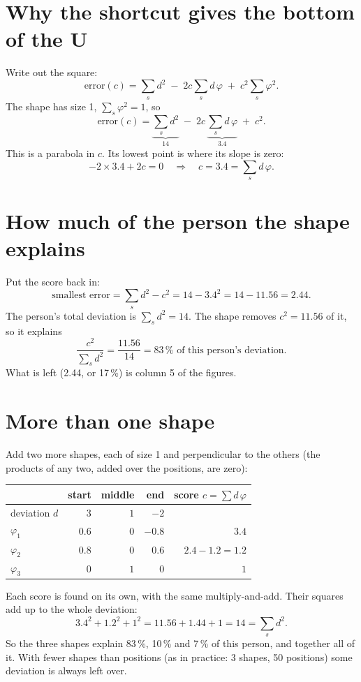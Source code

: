 \documentclass[11pt,a4paper]{article}
\begin{document}
\section{Why the shortcut gives the bottom of the U}
\label{sec:why}
Write out the square:
\[
  \text{error}(c) = \sum_s d^2 \;-\; 2c \sum_s d\,\varphi \;+\; c^2 \sum_s \varphi^2 .
\]
The shape has size 1, $\sum_s \varphi^2 = 1$, so
\[
  \text{error}(c) = \underbrace{\textstyle\sum_s d^2}_{14} \;-\; 2c\,\underbrace{\textstyle\sum_s d\,\varphi}_{3.4} \;+\; c^2 .
\]
This is a parabola in $c$. Its lowest point is where its slope is zero:
\[
  -2 \times 3.4 + 2c = 0 \quad\Longrightarrow\quad c = 3.4 = \sum_s d\,\varphi .
\]

\section{How much of the person the shape explains}
Put the score back in:
\[
  \text{smallest error} = \sum_s d^2 - c^2 = 14 - 3.4^2 = 14 - 11.56 = 2.44 .
\]
The person's total deviation is $\sum_s d^2 = 14$. The shape removes $c^2 = 11.56$ of it, so it explains
\[
  \frac{c^2}{\sum_s d^2} = \frac{11.56}{14} = 83\,\% \text{ of this person's deviation.}
\]
What is left (2.44, or 17\,\%) is column 5 of the figures.

\section{More than one shape}
Add two more shapes, each of size 1 and perpendicular to the others (the products of any two, added
over the positions, are zero):

\begin{center}
\begin{tabular}{lrrrr}
  \toprule
  & start & middle & end & score $c = \sum d\,\varphi$ \\
  \midrule
  deviation $d$ & $3$ & $1$ & $-2$ & \\
  $\varphi_1$ & $0.6$ & $0$ & $-0.8$ & $3.4$ \\
  $\varphi_2$ & $0.8$ & $0$ & $0.6$ & $2.4 - 1.2 = 1.2$ \\
  $\varphi_3$ & $0$ & $1$ & $0$ & $1$ \\
  \bottomrule
\end{tabular}
\end{center}

Each score is found on its own, with the same multiply-and-add. Their squares add up to the whole
deviation:
\[
  3.4^2 + 1.2^2 + 1^2 = 11.56 + 1.44 + 1 = 14 = \sum_s d^2 .
\]
So the three shapes explain 83\,\%, 10\,\% and 7\,\% of this person, and together all of it. With
fewer shapes than positions (as in practice: 3 shapes, 50 positions) some deviation is always left
over.
\end{document}
